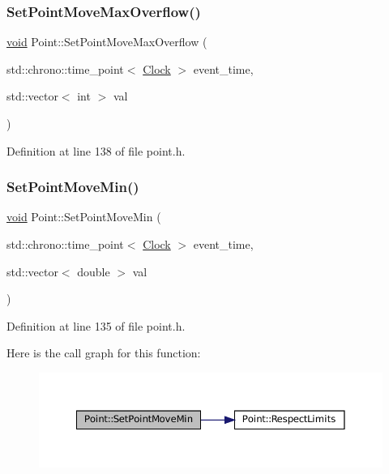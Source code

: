 \subsubsection{\texorpdfstring{Set\+Point\+Move\+Max\+Overflow()}{SetPointMoveMaxOverflow()}}
{\footnotesize\ttfamily \mbox{\hyperlink{glad_8h_a950fc91edb4504f62f1c577bf4727c29}{void}} Point\+::\+Set\+Point\+Move\+Max\+Overflow (\begin{DoxyParamCaption}\item[{std\+::chrono\+::time\+\_\+point$<$ \mbox{\hyperlink{universe_8h_a0ef8d951d1ca5ab3cfaf7ab4c7a6fd80}{Clock}} $>$}]{event\+\_\+time,  }\item[{std\+::vector$<$ int $>$}]{val }\end{DoxyParamCaption})\hspace{0.3cm}{\ttfamily [inline]}}



Definition at line 138 of file point.\+h.

\mbox{\label{class_point_a287698b6f3ec6a610447fded5c3542ca}} 
\subsubsection{\texorpdfstring{Set\+Point\+Move\+Min()}{SetPointMoveMin()}}
{\footnotesize\ttfamily \mbox{\hyperlink{glad_8h_a950fc91edb4504f62f1c577bf4727c29}{void}} Point\+::\+Set\+Point\+Move\+Min (\begin{DoxyParamCaption}\item[{std\+::chrono\+::time\+\_\+point$<$ \mbox{\hyperlink{universe_8h_a0ef8d951d1ca5ab3cfaf7ab4c7a6fd80}{Clock}} $>$}]{event\+\_\+time,  }\item[{std\+::vector$<$ double $>$}]{val }\end{DoxyParamCaption})\hspace{0.3cm}{\ttfamily [inline]}}



Definition at line 135 of file point.\+h.

Here is the call graph for this function\+:\nopagebreak
\begin{figure}[H]
\begin{center}
\leavevmode
\includegraphics[width=350pt]{class_point_a287698b6f3ec6a610447fded5c3542ca_cgraph}
\end{center}
\end{figure}
\mbox{\label{class_point_a4a988ff988a3984545cf0c35e764c404}} 
